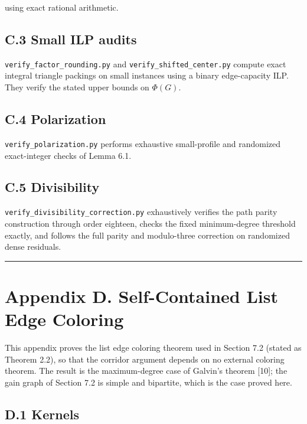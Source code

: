 \documentclass[
  american,
  11pt,
  a4paper,
]{article}
\begin{document}
using exact rational arithmetic.

\subsection{C.3 Small ILP audits}\label{c.3-small-ilp-audits}

\texttt{verify\_factor\_rounding.py} and \texttt{verify\_shifted\_center.py} compute exact integral triangle packings on small instances using a binary edge-capacity ILP. They verify the stated upper bounds on \(\Phi(G)\).

\subsection{C.4 Polarization}\label{c.4-polarization}

\texttt{verify\_polarization.py} performs exhaustive small-profile and randomized exact-integer checks of Lemma 6.1.

\subsection{C.5 Divisibility}\label{c.5-divisibility}

\texttt{verify\_divisibility\_correction.py} exhaustively verifies the path parity construction through order eighteen, checks the fixed minimum-degree threshold exactly, and follows the full parity and modulo-three correction on randomized dense residuals.

\begin{center}\rule{0.5\linewidth}{0.5pt}\end{center}

\section{Appendix D. Self-Contained List Edge Coloring}\label{appendix-d.-self-contained-list-edge-coloring}

This appendix proves the list edge coloring theorem used in Section 7.2 (stated as Theorem 2.2), so that the corridor argument depends on no external coloring theorem. The result is the maximum-degree case of Galvin's theorem {[}10{]}; the gain graph of Section 7.2 is simple and bipartite, which is the case proved here.

\subsection{D.1 Kernels}\label{d.1-kernels}
\end{document}
